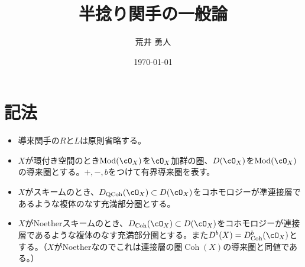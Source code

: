 \documentclass[uplatex, a4paper, dvipdfmx]{jsarticle}
\title{半捻り関手の一般論}
\author{荒井 勇人}
\date{\today}
\theoremstyle{definition}
\DeclareMathOperator{\Coh}{\mathrm{Coh}}
\DeclareMathOperator{\QCoh}{\mathrm{QCoh}}
\DeclareMathOperator{\Mod}{\mathrm{Mod}}
\begin{document}
\maketitle
\section{記法}
\begin{itemize}
    \item 導来関手の$R$と$L$は原則省略する。
    \item $X$が環付き空間のとき$\Mod(\cO_X)$を$\cO_X$加群の圏、$D(\cO_X)$を$\Mod(\cO_X)$の導来圏とする。$+, -, b$をつけて有界導来圏を表す。
    \item $X$がスキームのとき、$D_{\QCoh}(\cO_X) \subset D(\cO_X)$をコホモロジーが凖連接層であるような複体のなす充満部分圏とする。
    \item $X$がNoetherスキームのとき、$D_{\Coh}(\cO_X) \subset D(\cO_X)$をコホモロジーが連接層であるような複体のなす充満部分圏とする。また$D^b(X) = D_{\Coh}^b(\cO_X)$とする。（$X$がNoetherなのでこれは連接層の圏$\Coh(X)$の導来圏と同値である。）
\end{itemize}
\end{document}
